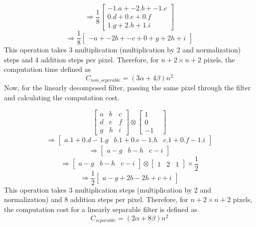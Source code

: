 \documentclass[a4paper,11pt]{article}
\begin{document}
\[
\Rightarrow \frac{1}{8}\begin{bmatrix}
     -1.a+-2.b+-1.c\\
     0.d+0.e+0.f\\
     1.g+2.h+1.i
\end{bmatrix}
\]
\[
\Rightarrow \frac{1}{8}\begin{bmatrix}
     -a+-2b+-c+0+g+2h+i
\end{bmatrix}
\]
\newline
This operation takes 3 multiplication (multiplication by 2 and normalization) steps and 4 addition steps per pixel. Therefore, for $n+2 \times n+2$ pixels, the computation time defined as 
\begin{equation}
\label{composed}
C_{non\_seperable} = (3 \alpha+4\beta)n^2
\end{equation}
\newline
Now, for the linearly decomposed filter, passing the same pixel through the filter and calculating the computation cost.

\[
\begin{bmatrix}
     a&b&c\\
     d&e&f\\
     g&h&i
\end{bmatrix}
 \otimes \begin{bmatrix}
     1&\\
     0\\
     -1
\end{bmatrix}
\]
\[
\Rightarrow \begin{bmatrix}
    a.1+0.d-1.g & b.1+0.e-1.h & c.1+0.f-1.i
\end{bmatrix}
\]
\[
\Rightarrow \begin{bmatrix}
    a-g & b-h & c-i
\end{bmatrix}
\]
\[
\Rightarrow \begin{bmatrix}
    a-g & b-h & c-i
\end{bmatrix} \otimes \begin{bmatrix}
    1&2&1
\end{bmatrix} \times\frac{1}{2}
\]
\[
\Rightarrow \frac{1}{2} \begin{bmatrix}
    a-g+2b-2h+c+i
\end{bmatrix}
\]
\newline
This operation takes 3 multiplication steps (multiplication by 2 and normalization) and 8 addition steps per pixel. Therefore, for $n+2 \times n+2$ pixels, the computation cost for a linearly separable filter is defined as 
\begin{equation}
\label{seperable}
    C_{separable} = (2 \alpha + 8 \beta) n^2
\end{equation}
\end{document}
